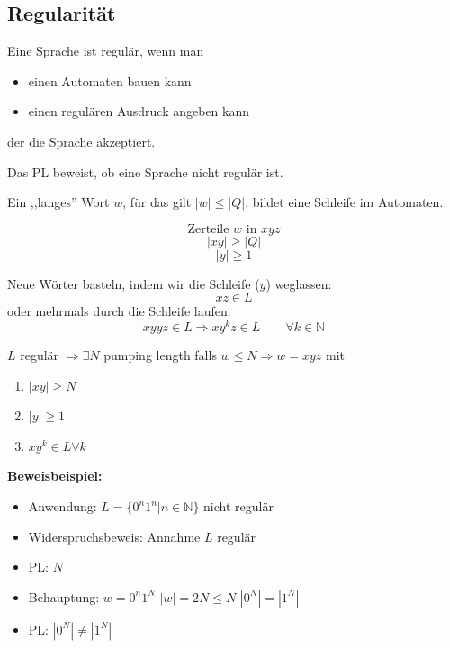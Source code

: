 \documentclass[a4paper]{article}
\begin{document}
\subsection{Regularität}
	\begin{multicols}{2}
	Eine Sprache ist regulär, wenn man
	\begin{itemize}
		\item einen Automaten bauen kann
		\item einen regulären Ausdruck angeben kann
	\end{itemize}
	der die Sprache akzeptiert.
	
	\begin{fdef}
	Das PL beweist, ob eine Sprache nicht regulär ist.
	\end{fdef}
	
	\begin{fmerke}
	Ein ,,langes'' Wort $w$, für das gilt $|w| \le |Q|$, bildet eine Schleife im Automaten.
	
	$$\text{Zerteile $w$ in $xyz$}$$
	$$|xy| \ge |Q|$$
	$$|y| \ge 1$$
	
	Neue Wörter basteln, indem wir die Schleife ($y$) weglassen: 
	$$xz \in L$$
	oder mehrmals durch die Schleife laufen:
	$$xyyz \in L \Rightarrow xy^kz \in L \qquad \forall k \in \mathbb{N}$$				
	\end{fmerke}

	
	\begin{falgo}
	$L$ regulär $\Rightarrow \exists N$ pumping length falls $w \le N \Rightarrow w=xyz$ mit 
	\begin{enumerate}
		\item $|xy| \ge N$
		\item $|y| \ge 1$
		\item $xy^k \in L \forall k$
	\end{enumerate} 
	\end{falgo}
	
	\textbf{Beweisbeispiel:}
	\begin{itemize}
		\item Anwendung: $L=\{0^n1^n | n \in \mathbb{N}\}$ nicht regulär 
		\item Widerspruchsbeweis: Annahme $L$ regulär
		\item PL: $N$
		\item Behauptung: $w=0^n1^N$   $|w| = 2N \le N$   $|0^N| = |1^N|$
		\item PL: $|0^N| \neq |1^N|$
	\end{itemize}
	
	\end{multicols}	
	
\end{document}
